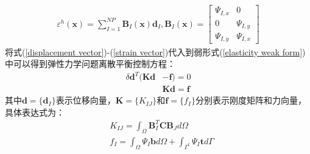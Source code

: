 \begin{equation}\label{strain vector}
\begin{split}
    \varepsilon^h(\pmb{x})=\sum_{I=1}^{N\!P}\pmb{B}_I(\pmb{x})\pmb{d}_I,\pmb{B}_I(\pmb{x})= \left[\begin{matrix}\Psi_{I,x}&0\\0&\Psi_{I,y}\\\Psi_{I,y}&\Psi_{I,x} \end{matrix}\right] 
\end{split}
\end{equation}
将式(\ref{displacement vector})-(\ref{strain vector})代入到弱形式(\ref{elasticity weak form})中可以得到弹性力学问题离散平衡控制方程：
\begin{equation}
\begin{split}
    \delta\pmb{d}^T(\pmb{K}\pmb{d}&-\pmb{f})=0\\
    &\pmb{K}\pmb{d}=\pmb{f}
\end{split}
\end{equation}
其中$\pmb{d}=\{\pmb d_I\}$表示位移向量，$\pmb{K}=\{K_{I\!J}\}$和$\pmb{f}=\{f_I\}$分别表示刚度矩阵和力向量，具体表达式为：
\begin{equation}
\begin{split}\label{EKf}
        &K_{I\!J}=\int_{\Omega}\pmb{B}_I^T\pmb{C}\pmb{B}_Jd\Omega\\
        &f_I=\int_{\Omega}\Psi_I\pmb{b}d\Omega+\int_{\Gamma^t}\Psi_I\pmb{t}d\Gamma
\end{split}
\end{equation}
